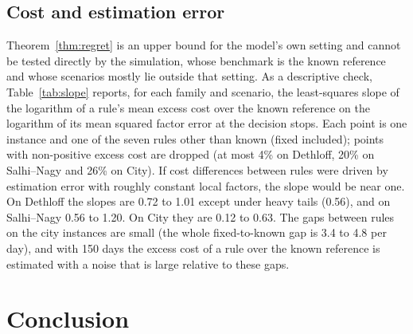 \documentclass[preprint,authoryear,12pt]{elsarticle}
\begin{document}
\begin{table}[t]
\centering\footnotesize
\caption{Number of zones, mixed scenario: share of the gap closed and
paired differences of the EB rule (95\% bootstrap intervals; bold
excludes zero).}\label{tab:sensZ}
\resizebox{\textwidth}{!}{}
\end{table}

\subsection{Cost and estimation error}

Theorem~\ref{thm:regret} is an upper bound for the model's own setting
and cannot be tested directly by the simulation, whose benchmark is the
known reference and whose scenarios mostly lie outside that setting. As
a descriptive check, Table~\ref{tab:slope} reports, for each family and
scenario, the least-squares slope of the logarithm of a rule's mean
excess cost over the known reference on the logarithm of its mean
squared factor error at the decision stops. Each point is one instance
and one of the seven rules other than known (fixed included); points
with non-positive excess cost are dropped (at most 4\% on Dethloff, 20\%
on Salhi--Nagy and 26\% on City). If cost differences between rules were
driven by estimation error with roughly constant local factors, the
slope would be near one. On Dethloff the slopes are 0.72 to 1.01 except
under heavy tails (0.56), and on Salhi--Nagy 0.56 to 1.20. On City they
are 0.12 to 0.63. The gaps between rules on the city instances are
small (the whole fixed-to-known gap is 3.4 to 4.8 per day), and with
150 days the excess cost of a rule over the known reference is
estimated with a noise that is large relative to these gaps.

\begin{table}[t]
\centering\footnotesize
\caption{Slope of log excess cost over the known reference on log mean
squared factor error (instances $\times$ the seven rules other than
known; points with non-positive excess dropped).}\label{tab:slope}

\end{table}

\section{Conclusion}\label{sec:conclusion}
\end{document}
